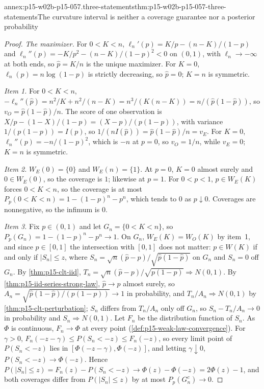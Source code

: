 \begin{annexitem}{annex:p15-w02b-p15-057.three-statements}{thm:p15-w02b-p15-057-three-statements}{The curvature interval is neither a coverage guarantee nor a posterior probability}
\begin{proof}
\emph{The maximizer.} For \(0<K<n\),
\(\ell_n'(p)=K/p-(n-K)/(1-p)\) and
\(\ell_n''(p)=-K/p^2-(n-K)/(1-p)^2<0\) on \((0,1)\), with
\(\ell_n\to-\infty\) at both ends, so \(\hat p=K/n\) is the unique
maximizer. For \(K=0\), \(\ell_n(p)=n\log(1-p)\) is strictly decreasing, so
\(\hat p=0\); \(K=n\) is symmetric.

\emph{Item 1.} For \(0<K<n\),
\(-\ell_n''(\hat p)=n^2/K+n^2/(n-K)=n^3/(K(n-K))=n/(\hat p(1-\hat p))\),
so \(v_O=\hat p(1-\hat p)/n\). The score of one observation is
\(X/p-(1-X)/(1-p)=(X-p)/(p(1-p))\), with variance \(1/(p(1-p))=I(p)\), so
\(1/(nI(\hat p))=\hat p(1-\hat p)/n=v_E\). For \(K=0\),
\(\ell_n''(p)=-n/(1-p)^2\), which is \(-n\) at \(p=0\), so \(v_O=1/n\),
while \(v_E=0\); \(K=n\) is symmetric.

\emph{Item 2.} \(W_E(0)=\{0\}\) and \(W_E(n)=\{1\}\). At \(p=0\),
\(K=0\) almost surely and \(0\in W_E(0)\), so the coverage is \(1\);
likewise at \(p=1\). For \(0<p<1\), \(p\in W_E(K)\) forces
\(0<K<n\), so the coverage is at most
\(P_p(0<K<n)=1-(1-p)^n-p^n\), which tends to \(0\) as \(p\downarrow0\).
Coverages are nonnegative, so the infimum is \(0\).

\emph{Item 3.} Fix \(p\in(0,1)\) and let \(G_n=\{0<K<n\}\), so
\(P_p(G_n)=1-(1-p)^n-p^n\to1\). On \(G_n\), \(W_E(K)=W_O(K)\) by item~1,
and since \(p\in[0,1]\) the intersection with \([0,1]\) does not matter:
\(p\in W(K)\) if and only if \(|S_n|\leq z\), where
\(S_n=\sqrt n(\hat p-p)/\sqrt{\hat p(1-\hat p)}\) on \(G_n\) and
\(S_n=0\) off \(G_n\). By \cref{thm:p15-clt-iid},
\(T_n=\sqrt n(\hat p-p)/\sqrt{p(1-p)}\Rightarrow N(0,1)\). By
\cref{thm:p15-iid-series-strong-law}, \(\hat p\to p\) almost surely, so
\(A_n=\sqrt{\hat p(1-\hat p)/(p(1-p))}\to1\) in probability, and
\(T_n/A_n\Rightarrow N(0,1)\) by \cref{thm:p15-clt-perturbation}; \(S_n\)
differs from \(T_n/A_n\) only off \(G_n\), so \(S_n-T_n/A_n\to0\) in
probability and \(S_n\Rightarrow N(0,1)\). Let \(F_n\) be the distribution
function of \(S_n\). As \(\Phi\) is continuous, \(F_n\to\Phi\) at every
point (\cref{def:p15-weak-law-convergence}). For \(\gamma>0\),
\(F_n(-z-\gamma)\leq P(S_n<-z)\leq F_n(-z)\), so every limit point of
\(P(S_n<-z)\) lies in \([\Phi(-z-\gamma),\Phi(-z)]\), and letting
\(\gamma\downarrow0\), \(P(S_n<-z)\to\Phi(-z)\). Hence
\(P(|S_n|\leq z)=F_n(z)-P(S_n<-z)\to\Phi(z)-\Phi(-z)=2\Phi(z)-1\), and both
coverages differ from \(P(|S_n|\leq z)\) by at most \(P_p(G_n^c)\to0\).


\end{proof}
\end{annexitem}
